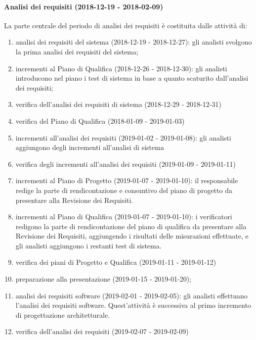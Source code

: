 		\paragraph{Analisi dei requisiti (2018-12-19 - 2018-02-09)\\} La parte centrale del periodo di analisi dei requisiti è costituita dalle attività di:
			\begin{enumerate}[label = 2.2.\arabic*)]
				\item analisi dei requisiti del sistema (2018-12-19 - 2018-12-27): gli analisti svolgono la prima analisi dei requisiti del sistema;
				\item incrementi al Piano di Qualifica (2018-12-26 - 2018-12-30): gli analisti introducono nel piano i test di sistema in base a quanto scaturito dall'analisi dei requisiti;
				\item verifica dell'analisi dei requisiti di sistema (2018-12-29 - 2018-12-31)
				\item verifica del Piano di Qualifica (2018-01-09 - 2019-01-03)
				\item incrementi all'analisi dei requisiti (2019-01-02 - 2019-01-08): gli analisti aggiungono degli incrementi all'analisi di sistema
				\item verifica degli incrementi all'analisi dei requisiti (2019-01-09 - 2019-01-11)
				\item incrementi al Piano di Progetto (2019-01-07 - 2019-01-10): il responsabile redige la parte di rendicontazione e consuntivo del piano di progetto da presentare alla Revisione dei Requisiti.
				\item incrementi al Piano di Qualifica (2019-01-07 - 2019-01-10): i verificatori redigono la parte di rendicontazione del piano di qualifica da presentare alla Revisione dei Requisiti, aggiungendo i risultati delle misurazioni effettuate, e gli analisti aggiungono i restanti test di sistema.
				\item verifica dei piani di Progetto e Qualifica (2019-01-11 - 2019-01-12)
				\item preparazione alla presentazione (2019-01-15 - 2019-01-20);
				\item analisi dei requisiti software (2019-02-01 - 2019-02-05): gli analisti effettuano l'analisi dei requisiti software. Quest'attività è successiva al primo incremento di progettazione architetturale.
				\item verifica dell'analisi dei requisiti (2019-02-07 - 2019-02-09)				
			\end{enumerate}

